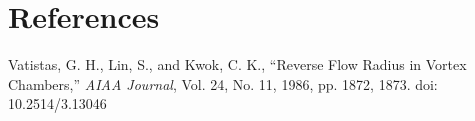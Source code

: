 
\section*{References}
\begin{thebibliography}{}
 Vatistas, G. H., Lin, S., and Kwok, C. K., ``Reverse Flow Radius in Vortex Chambers,'' \textit{AIAA Journal}, Vol. 24, No. 11, 1986, pp. 1872, 1873. doi: 10.2514/3.13046
\end{thebibliography}

